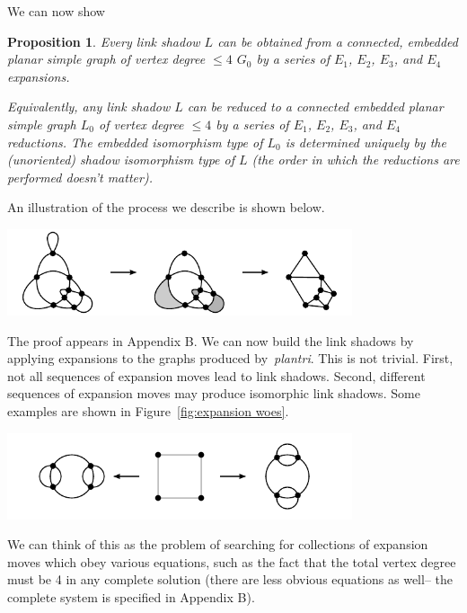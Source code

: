 \documentclass[amsmath,secnumarabic,floatfix,amssymb,nofootinbib,nobibnotes,letterpaper,11pt,tightenlines,showkeys]{revtex4}
\newtheorem{proposition}[theorem]{Proposition}
\theoremstyle{definition}
\newcommand{\loopinsert}{E_1}
\newcommand{\edgedouble}{E_2}
\newcommand{\cutedgedouble}{E_3}
\newcommand{\pairinsert}{E_4}
\let\mgp=\marginpar \marginparwidth18mm \marginparsep1mm
\def\marginpar#1{\mgp{\raggedright\tiny #1}}
\let\lbl=\label
\def\label#1{\lbl{#1}\ifinner\else\marginpar{\ref{#1} #1}\ignorespaces\fi}
\begin{document}
We can now show

\begin{proposition}
Every link shadow $L$ can be obtained from a connected, embedded planar simple graph of vertex degree $\leq 4$ $G_0$ by a series of $\loopinsert$, $\edgedouble$, $\cutedgedouble$, and $\pairinsert$ expansions.

Equivalently, any link shadow $L$ can be reduced to a connected embedded planar simple graph $L_0$ of vertex degree $\leq 4$ by a series of $\loopinsert$, $\edgedouble$, $\cutedgedouble$, and $\pairinsert$ reductions. The embedded isomorphism type of $L_0$ is determined uniquely by the (unoriented) shadow isomorphism type of $L$ (the order in which the reductions are performed doesn't matter).
\label{prop:reduce}
\end{proposition}

An illustration of the process we describe is shown below.

\begin{center}
\includegraphics[width=4in]{expansion-from-simple-graph.pdf}
\end{center}

The proof appears in Appendix B. We can now build the link shadows by applying expansions to the graphs produced by~\emph{plantri}. This is not trivial. First, not all sequences of expansion moves lead to link shadows. Second,
different sequences of expansion moves may produce isomorphic link shadows. Some examples are shown in Figure~\ref{fig:expansion woes}.
\begin{center}
\includegraphics[width=4in]{isomorphic-expansions.pdf}
\end{center}
We can think of this as the problem of searching for collections of expansion moves which obey various equations, such as the fact that the total vertex degree must be 4 in any complete solution (there are less obvious equations as well-- the complete system is specified in Appendix B). 
\end{document}

